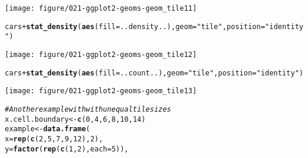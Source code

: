 \documentclass[a4paper,titlepage]{tufte-handout}\usepackage[]{graphicx}\usepackage[]{color}
\makeatletter
\def\maxwidth{ %
  \ifdim\Gin@nat@width>\linewidth
    \linewidth
  \else
    \Gin@nat@width
  \fi
}
\newcommand{\hlnum}[1]{\textcolor[rgb]{0.686,0.059,0.569}{#1}}%
\newcommand{\hlstr}[1]{\textcolor[rgb]{0.192,0.494,0.8}{#1}}%
\newcommand{\hlcom}[1]{\textcolor[rgb]{0.678,0.584,0.686}{\textit{#1}}}%
\newcommand{\hlopt}[1]{\textcolor[rgb]{0,0,0}{#1}}%
\newcommand{\hlstd}[1]{\textcolor[rgb]{0.345,0.345,0.345}{#1}}%
\newcommand{\hlkwb}[1]{\textcolor[rgb]{0.69,0.353,0.396}{#1}}%
\newcommand{\hlkwc}[1]{\textcolor[rgb]{0.333,0.667,0.333}{#1}}%
\newcommand{\hlkwd}[1]{\textcolor[rgb]{0.737,0.353,0.396}{\textbf{#1}}}%
\newenvironment{kframe}{%
 \def\at@end@of@kframe{}%
 \ifinner\ifhmode%
  \def\at@end@of@kframe{\end{minipage}}%
  \begin{minipage}{\columnwidth}%
 \fi\fi%
 \def\FrameCommand##1{\hskip\@totalleftmargin \hskip-\fboxsep
 \colorbox{shadecolor}{##1}\hskip-\fboxsep
     \hskip-\linewidth \hskip-\@totalleftmargin \hskip\columnwidth}%
 \MakeFramed {\advance\hsize-\width
   \@totalleftmargin\z@ \linewidth\hsize
   \@setminipage}}%
 {\par\unskip\endMakeFramed%
 \at@end@of@kframe}
\newenvironment{knitrout}{}{} %
\makeatother
\begin{document}
\begin{knitrout}
\begin{kframe}
{\ttfamily\noindent\itshape{}}\end{kframe}
\texttt{[image: figure/021-ggplot2-geoms-geom\_tile11]} 
\begin{kframe}\begin{alltt}
\hlstd{cars} \hlopt{+} \hlkwd{stat_density}\hlstd{(}\hlkwd{aes}\hlstd{(}\hlkwc{fill}\hlstd{=..density..),} \hlkwc{geom}\hlstd{=}\hlstr{"tile"}\hlstd{,} \hlkwc{position}\hlstd{=}\hlstr{"identity"}\hlstd{)}
\end{alltt}
\end{kframe}
\texttt{[image: figure/021-ggplot2-geoms-geom\_tile12]} 
\begin{kframe}\begin{alltt}
\hlstd{cars} \hlopt{+} \hlkwd{stat_density}\hlstd{(}\hlkwd{aes}\hlstd{(}\hlkwc{fill}\hlstd{=..count..),} \hlkwc{geom}\hlstd{=}\hlstr{"tile"}\hlstd{,} \hlkwc{position}\hlstd{=}\hlstr{"identity"}\hlstd{)}
\end{alltt}
\end{kframe}
\texttt{[image: figure/021-ggplot2-geoms-geom\_tile13]} 
\begin{kframe}\begin{alltt}
\hlcom{# Another example with with unequal tile sizes}
\hlstd{x.cell.boundary} \hlkwb{<-} \hlkwd{c}\hlstd{(}\hlnum{0}\hlstd{,} \hlnum{4}\hlstd{,} \hlnum{6}\hlstd{,} \hlnum{8}\hlstd{,} \hlnum{10}\hlstd{,} \hlnum{14}\hlstd{)}
\hlstd{example} \hlkwb{<-} \hlkwd{data.frame}\hlstd{(}
  \hlkwc{x} \hlstd{=} \hlkwd{rep}\hlstd{(}\hlkwd{c}\hlstd{(}\hlnum{2}\hlstd{,} \hlnum{5}\hlstd{,} \hlnum{7}\hlstd{,} \hlnum{9}\hlstd{,} \hlnum{12}\hlstd{),} \hlnum{2}\hlstd{),}
  \hlkwc{y} \hlstd{=} \hlkwd{factor}\hlstd{(}\hlkwd{rep}\hlstd{(}\hlkwd{c}\hlstd{(}\hlnum{1}\hlstd{,}\hlnum{2}\hlstd{),} \hlkwc{each}\hlstd{=}\hlnum{5}\hlstd{)),}

\end{alltt}
\end{kframe}
\end{knitrout}
\end{document}
